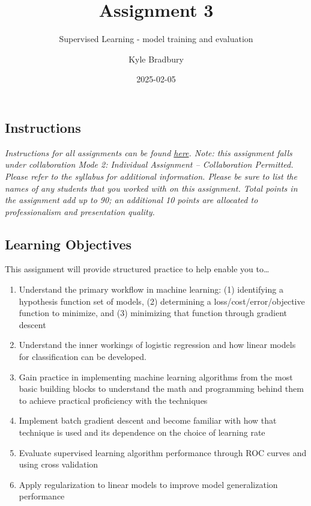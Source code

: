 \documentclass[
  letterpaper,
  DIV=11,
  numbers=noendperiod]{scrartcl}
\title{Assignment 3}
\subtitle{Supervised Learning - model training and evaluation}
\author{Kyle Bradbury}
\date{2025-02-05}
\providecommand{\tightlist}{%
  \setlength{\itemsep}{0pt}\setlength{\parskip}{0pt}}\usepackage{longtable,booktabs,array}
\renewcommand*\contentsname{Table of contents}
\newcommand\contentsname{Table of contents}
\begin{document}
\maketitle

\renewcommand*\contentsname{Table of contents}
{
\hypersetup{linkcolor=}
\setcounter{tocdepth}{1}
\tableofcontents
}

\subsection{Instructions}\label{instructions}

\emph{Instructions for all assignments can be found
\href{https://kylebradbury.github.io/ids705/notebooks/assignment_instructions.html}{here}.
Note: this assignment falls under collaboration Mode 2: Individual
Assignment -- Collaboration Permitted. Please refer to the syllabus for
additional information. Please be sure to list the names of any students
that you worked with on this assignment. Total points in the assignment
add up to 90; an additional 10 points are allocated to professionalism
and presentation quality.}

\subsection{Learning Objectives}\label{learning-objectives}

This assignment will provide structured practice to help enable you
to\ldots{}

\begin{enumerate}
\def\labelenumi{\arabic{enumi}.}
\tightlist
\item
  Understand the primary workflow in machine learning: (1) identifying a
  hypothesis function set of models, (2) determining a
  loss/cost/error/objective function to minimize, and (3) minimizing
  that function through gradient descent
\item
  Understand the inner workings of logistic regression and how linear
  models for classification can be developed.
\item
  Gain practice in implementing machine learning algorithms from the
  most basic building blocks to understand the math and programming
  behind them to achieve practical proficiency with the techniques
\item
  Implement batch gradient descent and become familiar with how that
  technique is used and its dependence on the choice of learning rate
\item
  Evaluate supervised learning algorithm performance through ROC curves
  and using cross validation
\item
  Apply regularization to linear models to improve model generalization
  performance
\end{enumerate}
\end{document}
